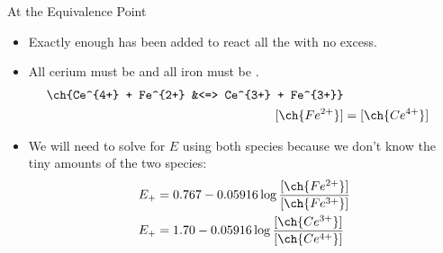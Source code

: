 \documentclass[notes=only]{beamer}
\begin{document}
\begin{frame}{At the Equivalence Point}
	\begin{itemize}
		\item Exactly enough  has been added to react all
			the  with \alert{no excess}.
		\item All cerium \alert{must} be  and all iron
			\alert{must} be .
			\begin{align*}
				\ch{Ce^{4+} + Fe^{2+} &<=> Ce^{3+} + Fe^{3+}} \\
				[\ch{Fe^{2+}}] &= [\ch{Ce^{4+}}]
			\end{align*}
		\item We will need to solve for $E$ using both species because
			we don't know the tiny amounts of the two species:
			\begin{align*}
				E_+ &= 0.767 - 0.05916 \log
				\frac{[\ch{Fe^{2+}}]}{[\ch{Fe^{3+}}]} \\
				E_+ &= 1.70 - 0.05916 \log
				\frac{[\ch{Ce^{3+}}]}{[\ch{Ce^{4+}}]}
			\end{align*}
	\end{itemize}



\end{frame}
\end{document}
